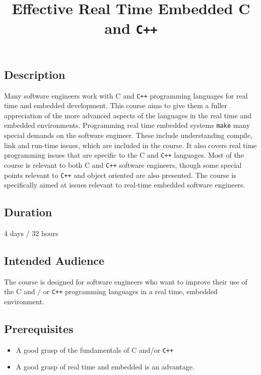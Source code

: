 \documentclass[
]{article}
\title{Effective Real Time Embedded C and \texttt{C++}}
\author{}
\date{}
\providecommand{\tightlist}{%
  \setlength{\itemsep}{0pt}\setlength{\parskip}{0pt}}
\begin{document}
\maketitle

\subsection{Description}\label{description}

Many software engineers work with C and \texttt{C++} programming
languages for real time and embedded development. This course aims to
give them a fuller appreciation of the more advanced aspects of the
languages in the real time and embedded environments. Programming real
time embedded systems \texttt{make} many special demands on the software
engineer. These include understanding compile, link and run-time issues,
which are included in the course. It also covers real time programming
issues that are specific to the C and \texttt{C++} languages. Most of
the course is relevant to both C and \texttt{C++} software engineers,
though some special points relevant to \texttt{C++} and object oriented
are also presented. The course is specifically aimed at issues relevant
to real-time embedded software engineers.

\subsection{Duration}\label{duration}

4 days / 32 hours

\subsection{Intended Audience}\label{intended-audience}

The course is designed for software engineers who want to improve their
use of the C and / or \texttt{C++} programming languages in a real time,
embedded environment.

\subsection{Prerequisites}\label{prerequisites}

\begin{itemize}
\tightlist
\item
  A good grasp of the fundamentals of C and/or \texttt{C++}
\item
  A good grasp of real time and embedded is an advantage.
\end{itemize}
\end{document}

